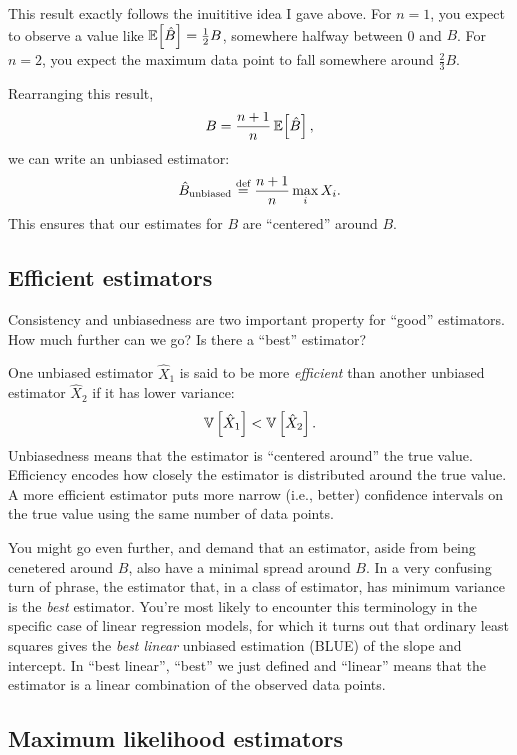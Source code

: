 This result exactly follows the inuititive idea I gave above. For $n=1$, you
expect to observe a value like $\mathbb{E}\!\left[{\hat{B}}\right] = \tfrac{1}{2} B$, somewhere
halfway between 0 and $B$. For $n=2$, you expect the maximum data point to fall
somewhere around $\tfrac{2}{3} B$.

Rearranging this result,
\begin{equation}
    B = \frac{n+1}{n} \, \mathbb{E}\!\left[{\hat{B}}\right],
\end{equation}
we can write an unbiased estimator:
\begin{equation}
\hat{B}_\mathrm{unbiased} \stackrel{\text{def}}{=} \frac{n+1}{n} \max_i X_i.
\end{equation}
This ensures that our estimates for $B$ are ``centered'' around $B$.

\subsection{Efficient estimators}

Consistency and unbiasedness are two important property for ``good'' estimators.
How much further can we go? Is there a ``best'' estimator?

One unbiased estimator $\hat{X}_1$ is said to be more \emph{efficient} than another
unbiased estimator $\hat{X}_2$ if it has lower variance:
\begin{equation*}
    \mathbb{V}\left[{\hat{X}_1}\right] < \mathbb{V}\left[{\hat{X}_2}\right].
\end{equation*}
Unbiasedness means that the estimator is ``centered around'' the true value.
Efficiency encodes how closely the estimator is distributed around the true
value. A more efficient estimator puts more narrow (i.e., better) confidence
intervals on the true value using the same number of data points.

You might go even further, and demand that an estimator, aside from being
cenetered around $B$, also have a minimal spread around $B$. In a very
confusing turn of phrase, the estimator that, in a class of estimator, has
minimum variance is the \emph{best} estimator. You're most likely to encounter
this terminology in the specific case of linear regression models, for which
it turns out that ordinary least squares gives the \emph{best linear} unbiased
estimation (BLUE) of the slope and intercept. In ``best linear'', ``best'' we just
defined and ``linear'' means that the estimator is a linear combination of the
observed data points.

\subsection{Maximum likelihood estimators}

